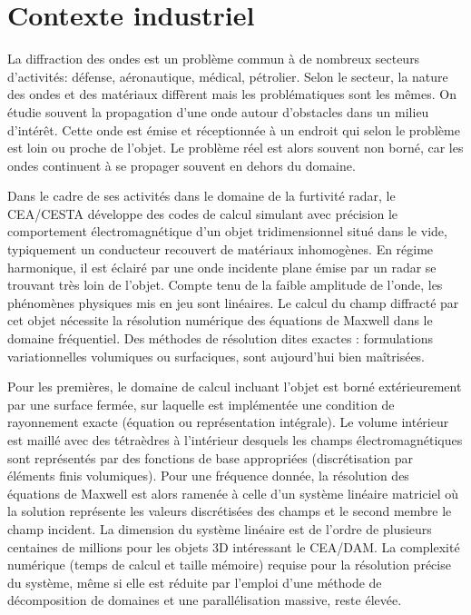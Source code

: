 \section*{Contexte industriel}
La diffraction des ondes est un problème commun à de nombreux secteurs d'activités: défense, aéronautique, médical, pétrolier.
Selon le secteur, la nature des ondes et des matériaux diffèrent mais les problématiques sont les mêmes.
On étudie souvent la propagation d'une onde autour d'obstacles dans un milieu d’intérêt.
Cette onde est émise et réceptionnée à un endroit qui selon le problème est loin ou proche de l'objet.
Le problème réel est alors souvent non borné, car les ondes continuent à se propager souvent en dehors du domaine.

Dans le cadre de ses activités dans le domaine de la furtivité radar, le CEA/CESTA développe des codes de calcul simulant avec précision le comportement électromagnétique d’un objet tridimensionnel situé dans le vide, typiquement un conducteur recouvert de matériaux inhomogènes.
En régime harmonique, il est éclairé par une onde incidente plane émise par un radar se trouvant très loin de l’objet.
Compte tenu de la faible amplitude de l’onde, les phénomènes physiques mis en jeu sont linéaires.
Le calcul du champ diffracté par cet objet nécessite la résolution numérique des équations de Maxwell dans le domaine fréquentiel.
Des méthodes de résolution dites exactes : formulations variationnelles volumiques ou surfaciques, sont aujourd’hui bien maîtrisées.

Pour les premières, le domaine de calcul incluant l’objet est borné extérieurement par une surface fermée, sur laquelle est implémentée une condition de rayonnement exacte (équation ou représentation intégrale).
Le volume intérieur est maillé avec des tétraèdres à l’intérieur desquels les champs électromagnétiques sont représentés par des fonctions de base appropriées (discrétisation par éléments finis volumiques).
Pour une fréquence donnée, la résolution des équations de Maxwell est alors ramenée à celle d’un système linéaire matriciel où la solution représente les valeurs discrétisées des champs et le second membre le champ incident.
La dimension du système linéaire est de l’ordre de plusieurs centaines de millions pour les objets 3D intéressant le CEA/DAM.
La complexité numérique (temps de calcul et taille mémoire) requise pour la résolution précise du système, même si elle est réduite par l'emploi d'une méthode de décomposition de domaines et une parallélisation massive, reste élevée.

